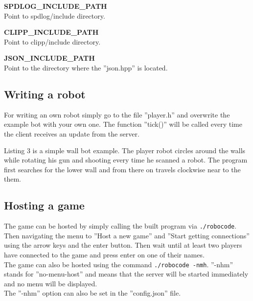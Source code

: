 \documentclass[12pt]{report}
\begin{document}
\textbf{SPDLOG\_INCLUDE\_PATH} \\
Point to spdlog/include directory.

\textbf{CLIPP\_INCLUDE\_PATH} \\
Point to clipp/include directory.

\textbf{JSON\_INCLUDE\_PATH} \\
Point to the directory where the ''json.hpp'' is located.

\subsection{Writing a robot}
For writing an own robot simply go to the file ''player.h'' and overwrite the example bot with your own one. The function ''tick()'' will be called every time the client receives an update from the server.

\scriptsize

\normalsize

Listing 3 is a simple wall bot example. The player robot circles around the walls while rotating his gun and shooting every time he scanned a robot. The program first searches for the lower wall and from there on travels clockwise near to the them.

\subsection{Hosting a game}
The game can be hosted by simply calling the built program via \lstinline{./robocode}. Then navigating the menu to ''Host a new game'' and ''Start getting connections'' using the arrow keys and the enter button. Then wait until at least two players have connected to the game and press enter on one of their names. \\

The game can also be hosted using the command \lstinline{./robocode -nmh}. ''-nhm'' stands for ''no-menu-host'' and means that the server will be started immediately and no menu will be displayed. \\

The ''-nhm'' option can also be set in the ''config.json'' file.
\end{document}
